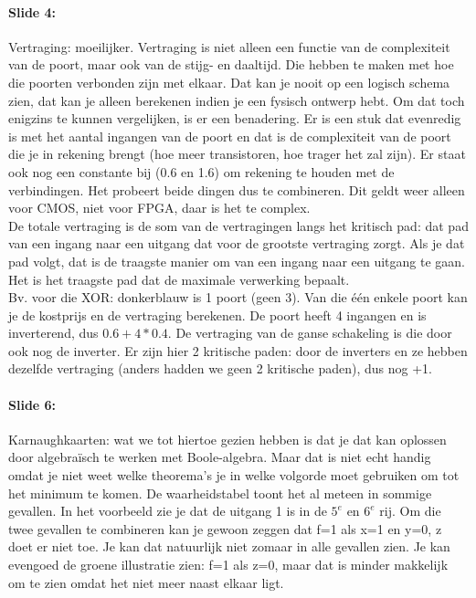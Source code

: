 \documentclass[10pt,a4paper]{book}
\begin{document}
\paragraph{Slide 4:} Vertraging: moeilijker. Vertraging is niet alleen een functie van de complexiteit van de poort, maar ook van de stijg- en daaltijd. Die hebben te maken met hoe die poorten verbonden zijn met elkaar. Dat kan je nooit op een logisch schema zien, dat kan je alleen berekenen indien je een fysisch ontwerp hebt. Om dat toch enigzins te kunnen vergelijken, is er een benadering. Er is een stuk dat evenredig is met het aantal ingangen van de poort en dat is de complexiteit van de poort die je in rekening brengt (hoe meer transistoren, hoe trager het zal zijn). Er staat ook nog een constante bij (0.6 en 1.6) om rekening te houden met de verbindingen. Het probeert beide dingen dus te combineren. Dit geldt weer alleen voor CMOS, niet voor FPGA, daar is het te complex.\\
De totale vertraging is de som van de vertragingen langs het kritisch pad: dat pad van een ingang naar een uitgang dat voor de grootste vertraging zorgt. Als je dat pad volgt, dat is de traagste manier om van een ingang naar een uitgang te gaan. Het is het traagste pad dat de maximale verwerking bepaalt.\\
Bv. voor die XOR: donkerblauw is 1 poort (geen 3). Van die \'e\'en enkele poort kan je de kostprijs en de vertraging berekenen. De poort heeft 4 ingangen en is inverterend, dus $0.6+4*0.4$. De vertraging van de ganse schakeling is die door ook nog de inverter. Er zijn hier 2 kritische paden: door de inverters en ze hebben dezelfde vertraging (anders hadden we geen 2 kritische paden), dus nog +1.

\paragraph{Slide 6:} Karnaughkaarten: wat we tot hiertoe gezien hebben is dat je dat kan oplossen door algebra\"isch te werken met Boole-algebra. Maar dat is niet echt handig omdat je niet weet welke theorema's je in welke volgorde moet gebruiken om tot het minimum te komen. De waarheidstabel toont het al meteen in sommige gevallen. In het voorbeeld zie je dat de uitgang 1 is in de $5^e$ en $6^e$ rij. Om die twee gevallen te combineren kan je gewoon zeggen dat f=1 als x=1 en y=0, z doet er niet toe. Je kan dat natuurlijk niet zomaar in alle gevallen zien. Je kan evengoed de groene illustratie zien: f=1 als z=0, maar dat is minder makkelijk om te zien omdat het niet meer naast elkaar ligt. 
\end{document}
